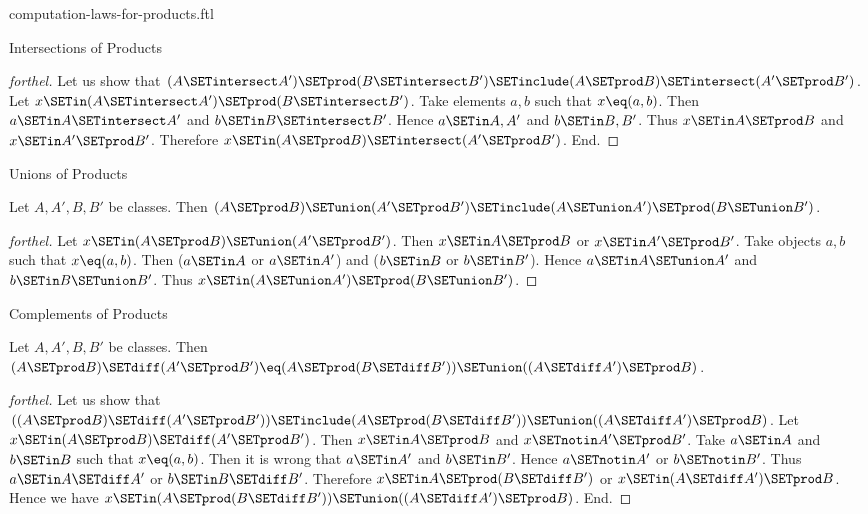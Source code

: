 \documentclass{naproche-library}
\begin{document}
\begin{smodule}[title=Computation Laws for Cartesian Products]{computation-laws-for-products.ftl}
\begin{sfragment}{Intersections of Products}
\begin{proof}[forthel]
    Let us show that $(A \SETintersect A') \SETprod (B \SETintersect B') \SETinclude (A \SETprod B) \SETintersect (A' \SETprod B')$.
      Let $x \SETin (A \SETintersect A') \SETprod (B \SETintersect B')$.
      Take elements $a, b$ such that $x \eq (a, b)$.
      Then $a \SETin A \SETintersect A'$ and $b \SETin B \SETintersect B'$.
      Hence $a \SETin A, A'$ and $b \SETin B, B'$.
      Thus $x \SETin A \SETprod B$ and $x \SETin A' \SETprod B'$.
      Therefore $x \SETin (A \SETprod B) \SETintersect (A' \SETprod B')$.
    End.
  \end{proof}
\end{sfragment}

\begin{sfragment}{Unions of Products}
  \begin{proposition}[forthel,id=FOUNDATIONS_05_7090174334861312]
    Let $A, A', B, B'$ be classes.
    Then $(A \SETprod B) \SETunion (A' \SETprod B') \SETinclude (A \SETunion A') \SETprod (B \SETunion B')$.
  \end{proposition}
  \begin{proof}[forthel]
    Let $x \SETin (A \SETprod B) \SETunion (A' \SETprod B')$.
    Then $x \SETin A \SETprod B$ or $x \SETin A' \SETprod B'$.
    Take objects $a, b$ such that $x \eq (a, b)$.
    Then ($a \SETin A$ or $a \SETin A'$) and ($b \SETin B$ or $b \SETin B'$).
    Hence $a \SETin A \SETunion A'$ and $b \SETin B \SETunion B'$.
    Thus $x \SETin (A \SETunion A') \SETprod (B \SETunion B')$.
  \end{proof}
\end{sfragment}

\begin{sfragment}{Complements of Products}
  \begin{proposition}[forthel,id=FOUNDATIONS_05_5552125989879808]
    Let $A, A', B, B'$ be classes.
    Then $(A \SETprod B) \SETdiff (A' \SETprod B') \eq (A \SETprod (B \SETdiff B')) \SETunion ((A \SETdiff A') \SETprod B)$.
  \end{proposition}
  \begin{proof}[forthel]
    Let us show that $((A \SETprod B) \SETdiff (A' \SETprod B')) \SETinclude (A \SETprod (B \SETdiff B')) \SETunion ((A \SETdiff A') \SETprod B)$.
      Let $x \SETin (A \SETprod B) \SETdiff (A' \SETprod B')$.
      Then $x \SETin A \SETprod B$ and $x \SETnotin A' \SETprod B'$.
      Take $a \SETin A$ and $b \SETin B$ such that $x \eq (a, b)$.
      Then it is wrong that $a \SETin A'$ and $b \SETin B'$.
      Hence $a \SETnotin A'$ or $b \SETnotin B'$.
      Thus $a \SETin A \SETdiff A'$ or $b \SETin B \SETdiff B'$.
      Therefore $x \SETin A \SETprod (B \SETdiff B')$ or $x \SETin (A \SETdiff A') \SETprod B$.
      Hence we have $x \SETin (A \SETprod (B \SETdiff B')) \SETunion ((A \SETdiff A') \SETprod B)$.
    End.


\end{proof}
\end{sfragment}
\end{smodule}
\end{document}
